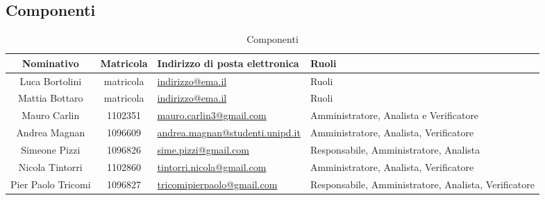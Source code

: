 \documentclass[a4paper,titlepage]{article}
\begin{document}
\subsection{Componenti}
\begin{table}[H]
	\begin{center}
		\setlength{\extrarowheight}{\jot}
		\begin{tabular}{|c|c|p{5cm}|p{4.3cm}|}
			\hline
			\textbf{Nominativo} & \textbf{Matricola} & \raggedright \textbf{Indirizzo di posta elettronica} & \textbf{Ruoli} \\[1ex]
			\hline
	 		Luca Bortolini & matricola	& \href{mailto:indirizzo@ema.il}{indirizzo@ema.il} & Ruoli \\[1ex]
			\hline
			Mattia Bottaro & matricola	& \href{mailto:indirizzo@ema.il}{indirizzo@ema.il} & Ruoli \\[1ex]
			\hline
			Mauro Carlin & 1102351	& \href{mailto:indirizzo@ema.il}{mauro.carlin3@gmail.com} & Amministratore, Analista e Verificatore	\\[1ex]
			\hline
			Andrea Magnan & 1096609 & \href{mailto:andrea.magnan@studenti.unipd.it}{andrea.magnan@studenti.unipd.it} & Amministratore, Analista, Verificatore\\[1ex]
			\hline
			Simeone Pizzi & 1096826	& \href{mailto:sime.pizzi@gmail.com}{sime.pizzi@gmail.com} 	& Responsabile, Amministratore, Analista \\[1ex]
			\hline
			Nicola Tintorri	& 1102860 & \href{mailto:tintorri.nicola@gmail.com}{tintorri.nicola@gmail.com} & Amministratore, Analista, Verificatore 	\\[1ex]
			\hline
			Pier Paolo Tricomi	& 1096827	& \href{mailto:tricomipierpaolo@gmail.com}{tricomipierpaolo@gmail.com} & Responsabile, Amministratore, Analista, Verificatore \\[1ex]
			\hline	
		\end{tabular}
	\end{center}
	\caption{Componenti}
\end{table}
\end{document}
